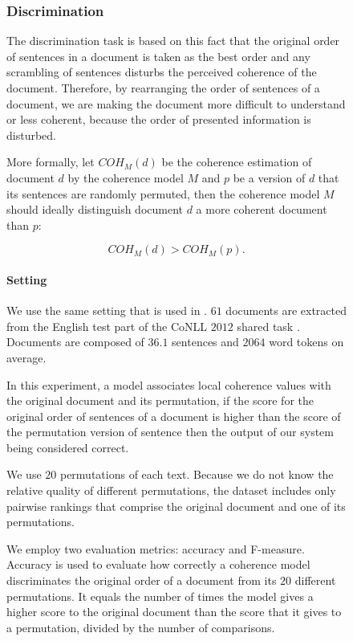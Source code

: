 \begin{figure}[!t]
\subsubsection{Discrimination}
%
The discrimination task is based on this fact that the original order of sentences in a document is taken as the best order and any scrambling of sentences disturbs the perceived coherence of the document. 
Therefore, by rearranging the order of sentences of a document, we are making the document more difficult to understand or less coherent, because the order of presented information is disturbed. 

More formally, let $COH_M(d)$ be the coherence estimation of document $d$ by the coherence model $M$ and $p$ be a version of $d$ that its sentences are randomly permuted, then the coherence model $M$ should ideally distinguish document $d$ a more coherent document than $p$:

\begin{equation}
COH_M(d) > COH_M(p). 
\end{equation}


\paragraph{Setting}
%
We use the same setting that is used in . 
$61$ documents are extracted from the English test part of the CoNLL $2012$ shared task \cite{pradhan12}. 
Documents are composed of $36.1$ sentences and $2064$ word tokens on average. 

In this experiment, a model associates local coherence values with the original document and its permutation, if the score for the original order of sentences of a document is higher than the score of the permutation version of sentence then the output of our system being considered correct. 

We use $20$ permutations of each text. 
Because we do not know the relative quality of different permutations, the dataset includes only pairwise rankings that comprise the original document and one of its permutations.

We employ two evaluation metrics: accuracy and F-measure. 
Accuracy is used to evaluate how correctly a coherence model discriminates the original order of a document from its $20$ different permutations.
It equals the number of times the model gives a higher score to the original document than the score that it gives to a permutation, divided by the number of comparisons.


\end{figure}
